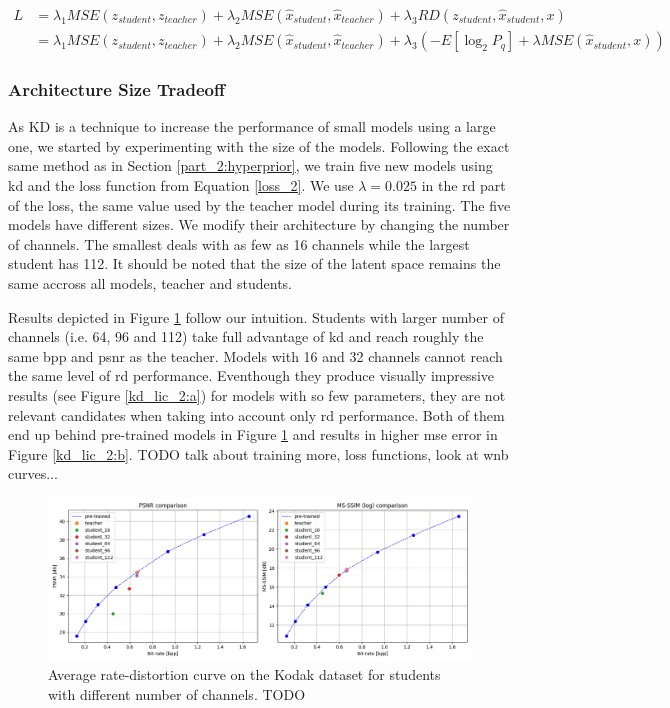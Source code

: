 \begin{align}
    L &= \lambda_{1} MSE(z_{student}, z_{teacher}) + \lambda_{2} MSE(\hat{x}_{student}, \hat{x}_{teacher}) + \lambda_{3} RD(z_{student}, \hat{x}_{student}, x)\label{loss_2}\\
      &= \lambda_{1} MSE(z_{student}, z_{teacher}) + \lambda_{2} MSE(\hat{x}_{student}, \hat{x}_{teacher}) + \lambda_{3} (-E[\log_{2}P_{q}] + \lambda MSE(\hat{x}_{student}, x)) \nonumber
\end{align}

\subsubsection{Architecture Size Tradeoff}
As \acrshort{KD} is a technique to increase the performance of small models using a large one, we started by experimenting with the size of the models. Following the exact same method as in Section \ref{part_2:hyperprior}, we train five new models using \acrshort{kd} and the loss function from Equation \ref{loss_2}. We use \(\lambda = 0.025\) in the \acrshort{rd} part of the loss, the same value used by the teacher model during its training. The five models have different sizes. We modify their architecture by changing the number of channels. The smallest deals with as few as 16 channels while the largest student has 112. It should be noted that the size of the latent space remains the same accross all models, teacher and students.

Results depicted in Figure \ref{kd_lic_1} follow our intuition. Students with larger number of channels (i.e. 64, 96 and 112) take full advantage of \acrshort{kd} and reach roughly the same \acrshort{bpp} and \acrshort{psnr} as the teacher. Models with 16 and 32 channels cannot reach the same level of \acrshort{rd} performance. Eventhough they produce visually impressive results (see Figure \ref{kd_lic_2:a}) for models with so few parameters, they are not relevant candidates when taking into account only \acrshort{rd} performance. Both of them end up behind pre-trained models in Figure \ref{kd_lic_1} and results in higher \acrshort{mse} error in Figure \ref{kd_lic_2:b}. TODO talk about training more, loss functions, look at wnb curves...

\begin{figure}
    \centering
    \includegraphics[width=15cm]{img/kd_lic_rd_channels.png}
    \caption[Average rate-distortion curve on the Kodak dataset for students with different number of channels.]{Average rate-distortion curve on the Kodak dataset for students with different number of channels. TODO}
    \label{kd_lic_1}
\end{figure}

